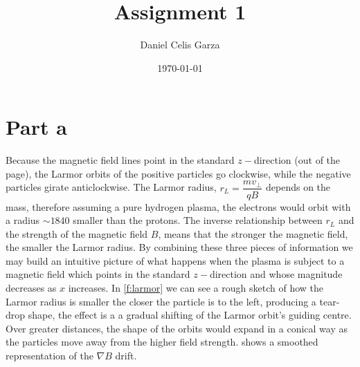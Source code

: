 \documentclass[10pt,a4paper]{article}
\title{Assignment 1}
\author{Daniel Celis Garza}
\date{\today}
\begin{document}
	\maketitle
	\section{Part a}
	Because the magnetic field lines point in the standard $z-$direction (out of the page), the Larmor orbits of the positive particles go clockwise, while the negative particles girate anticlockwise. The Larmor radius, $r_{L} = \dfrac{m v_{\perp}}{q B}$ depends on the mass, therefore assuming a pure hydrogen plasma, the electrons would orbit with a radius $\sim 1840$ smaller than the protons. The inverse relationship between $r_{L}$ and the strength of the magnetic field $B$, means that the stronger the magnetic field, the smaller the Larmor radius. By combining these three pieces of information we may build an intuitive picture of what happens when the plasma is subject to a magnetic field which points in the standard $z-$direction and whose magnitude decreases as $x$ increases. In \cref{f:larmor} we can see a rough sketch of how the Larmor radius is smaller the closer the particle is to the left, producing a tear-drop shape, the effect is a a gradual shifting of the Larmor orbit's guiding centre. Over greater distances, the shape of the orbits would expand in a conical way as the particles move away from the higher field strength.  shows a smoothed representation of the $\nabla B$ drift.
\end{document}
